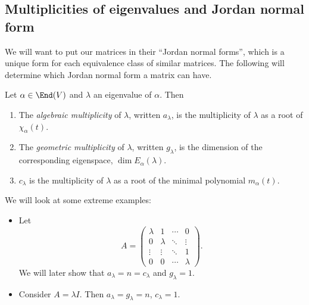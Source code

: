 \documentclass[a4paper]{article}
\begin{document}
\subsection{Multiplicities of eigenvalues and Jordan normal form}
We will want to put our matrices in their ``Jordan normal forms'', which is a unique form for each equivalence class of similar matrices. The following will determine which Jordan normal form a matrix can have.
\begin{defi}
  Let $\alpha \in \End (V)$ and $\lambda$ an eigenvalue of $\alpha$. Then
  \begin{enumerate}
    \item The \emph{algebraic multiplicity} of $\lambda$, written $a_\lambda$, is the multiplicity of $\lambda$ as a root of $\chi_\alpha(t)$.
    \item The \emph{geometric multiplicity} of $\lambda$, written $g_\lambda$, is the dimension of the corresponding eigenspace, $\dim E_\alpha(\lambda)$.
    \item $c_\lambda$ is the multiplicity of $\lambda$ as a root of the minimal polynomial $m_\alpha(t)$.
  \end{enumerate}
\end{defi}

We will look at some extreme examples:
\begin{eg}\leavevmode
  \begin{itemize}
    \item Let
      \[
        A =
        \begin{pmatrix}
          \lambda & 1 & \cdots & 0\\
          0 & \lambda & \ddots & \vdots\\
          \vdots & \vdots & \ddots & 1\\
          0 & 0 & \cdots & \lambda
        \end{pmatrix}.
      \]
      We will later show that $a_\lambda = n = c_\lambda$ and $g_\lambda = 1$.
    \item Consider $A = \lambda I$. Then $a_\lambda = g_\lambda = n$, $c_\lambda = 1$.
  \end{itemize}
\end{eg}
\end{document}
